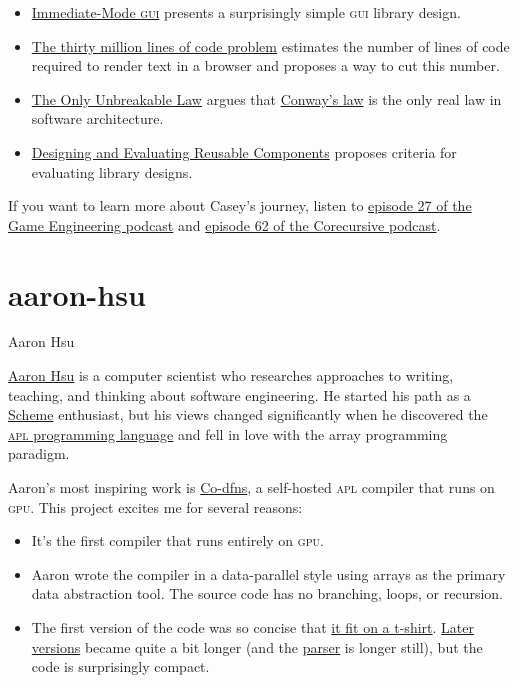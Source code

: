 \documentclass{article}
\begin{document}
\begin{itemize}
\item \href{https://youtu.be/Z1qyvQsjK5Y?si=5H2oCzHt5L4w_zza}{Immediate-Mode \textsc{gui}} presents a surprisingly simple \textsc{gui} library design.
\item \href{https://caseymuratori.com/blog_0031}{The thirty million lines of code problem} estimates the number of lines of code required to render text in a browser and proposes a way to cut this number.
\item \href{https://youtu.be/5IUj1EZwpJY?si=H2jAfn705HYxIMsP}{The Only Unbreakable Law} argues that \href{https://en.wikipedia.org/wiki/Conway's_law}{Conway's law} is the only real law in software architecture.
\item \href{https://caseymuratori.com/blog_0024}{Designing and Evaluating Reusable Components} proposes criteria for evaluating library designs.
\end{itemize}

If you want to learn more about Casey's journey, listen to \href{https://youtu.be/0WYgKc00J8s?si=x_VwD4bJj-jceMgG}{episode 27 of the Game Engineering podcast} and \href{https://corecursive.com/062-game-programming/}{episode 62 of the Corecursive podcast}.

\section{aaron-hsu}{Aaron Hsu}

\href{https://www.sacrideo.us/}{Aaron Hsu} is a computer scientist who researches approaches to writing, teaching, and thinking about software engineering.
He started his path as a \href{https://www.scheme.org/}{Scheme} enthusiast,
but his views changed significantly when he discovered the \href{https://aplwiki.com/}{\textsc{apl} programming language} and fell in love with the array programming paradigm.

Aaron's most inspiring work is \href{https://github.com/Co-dfns/Co-dfns}{Co-dfns}, a self-hosted \textsc{apl} compiler that runs on \textsc{gpu}.
This project excites me for several reasons:

\begin{itemize}
\item It's the first compiler that runs entirely on \textsc{gpu}.
\item Aaron wrote the compiler in a data-parallel style using arrays as the primary data abstraction tool. The source code has no branching, loops, or recursion.
\item The first version of the code was so concise that \href{https://www.bonfire.com/co-dfns-thesis-edition}{it fit on a t-shirt}.
  \href{https://github.com/Co-dfns/Co-dfns/blob/63ff5921fab3d9dc238330e2d28f0ace4b801e9a/cmp/TT.apl}{Later versions} became quite a bit longer
  (and the \href{https://github.com/Co-dfns/Co-dfns/blob/63ff5921fab3d9dc238330e2d28f0ace4b801e9a/cmp/PS.apl}{parser} is longer still),
  but the code is surprisingly compact.
\end{itemize}
\end{document}
